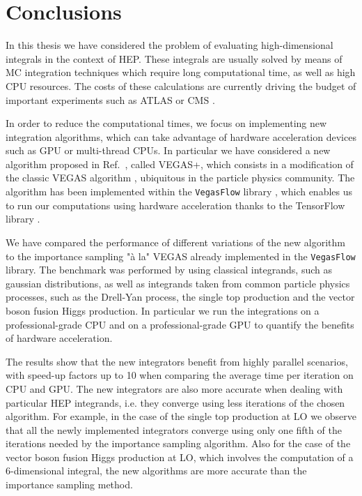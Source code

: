 \documentclass[../main/main.tex]{subfiles}
\begin{document}
\chapter{Conclusions}

In this thesis we have considered the problem of evaluating high-dimensional integrals in the context of HEP.
These integrals are usually solved by means of MC integration techniques which require long computational time, as well as high CPU resources.
The costs of these calculations are currently driving the budget of important experiments such as ATLAS or CMS \cite{Buckley:2019wov}.

In order to reduce the computational times, we focus on implementing new integration algorithms, which can take advantage of hardware acceleration devices such as GPU or multi-thread CPUs.
In particular we have considered a new algorithm proposed in Ref.~\cite{Lepage:2020tgj}, called VEGAS+,  which consists in a modification of the classic VEGAS algorithm \cite{Lepage:1977sw}, ubiquitous in the particle physics community.
The algorithm has been implemented within the \texttt{VegasFlow} library \cite{Carrazza:2020rdn}, which enables us to run our computations using hardware acceleration thanks to the TensorFlow library
\cite{tensorflow2015-whitepaper}. 

We have compared the performance of different variations of the new algorithm to the importance sampling "à la" VEGAS already implemented in the \texttt{VegasFlow} library. The benchmark was performed by using classical integrands, such as gaussian distributions, as well as integrands taken from common particle physics processes, such as the Drell-Yan process, the single top production and the vector boson fusion Higgs production. In particular we run the integrations on a professional-grade CPU and on a professional-grade GPU to quantify the benefits of hardware acceleration.

The results show that the new integrators benefit from highly parallel scenarios, with speed-up factors up to 10 when comparing the average time per iteration on CPU and GPU. The new integrators are also more accurate when dealing with particular HEP integrands, i.e. they converge using less iterations of the chosen algorithm. For example, 
in the case of the single top production at LO we observe that all the newly implemented integrators converge using only one fifth of the iterations needed by the importance sampling algorithm. Also for the case of the vector boson fusion Higgs production at LO, which involves the computation of a 6-dimensional integral, the new algorithms are more accurate than the importance sampling method.
\end{document}
